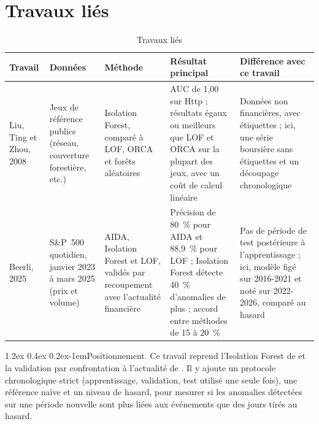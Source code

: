 \documentclass[11pt,a4paper]{article}
\makeatletter
\renewcommand\paragraph{\@startsection{paragraph}{4}{\z@}%
  {1.2ex \@plus 0.4ex \@minus 0.2ex}{-1em}{\normalfont\normalsize\bfseries}}
\makeatother
\begin{document}
\section{Travaux liés}
\label{sec:travaux}
\begin{table}[htbp]
  \centering
  \caption{Travaux liés}
  \label{tab:travaux}
  \small
  \begin{tabular}{@{}P{2.4cm} P{2.8cm} P{2.8cm} P{3.4cm} P{3.8cm}@{}}
    \toprule
    Travail & Données & Méthode & Résultat principal & Différence avec ce travail \\
    \midrule
    Liu, Ting et Zhou, 2008 \cite{lie1} & Jeux de référence publics (réseau, couverture forestière, etc.) & Isolation Forest, comparé à LOF, ORCA et forêts aléatoires & AUC de 1,00 sur Http ; résultats égaux ou meilleurs que LOF et ORCA sur la plupart des jeux, avec un coût de calcul linéaire & Données non financières, avec étiquettes ; ici, une série boursière sans étiquettes et un découpage chronologique \\
    Beerli, 2025 \cite{lie2} & S\&P~500 quotidien, janvier 2023 à mars 2025 (prix et volume) & AIDA, Isolation Forest et LOF, validés par recoupement avec l'actualité financière & Précision de 80~\% pour AIDA et 88,9~\% pour LOF ; Isolation Forest détecte 40~\% d'anomalies de plus ; accord entre méthodes de 15 à 20~\% & Pas de période de test postérieure à l'apprentissage ; ici, modèle figé sur 2016-2021 et noté sur 2022-2026, comparé au hasard \\
    \bottomrule
  \end{tabular}
\end{table}

\paragraph{Positionnement.} Ce travail reprend l'Isolation Forest de \cite{lie1} et la validation par confrontation à l'actualité de \cite{lie2}. Il y ajoute un protocole chronologique strict (apprentissage, validation, test utilisé une seule fois), une référence naïve et un niveau de hasard, pour mesurer si les anomalies détectées sur une période nouvelle sont plus liées aux événements que des jours tirés au hasard.

\end{document}
